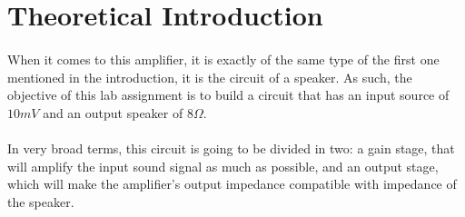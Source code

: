 \section{Theoretical Introduction}
\label{sec:theoretical}


\paragraph{}When it comes to this amplifier, it is exactly of the same type of the first one mentioned in the introduction, it is the circuit of a speaker. As such, the objective of this lab assignment is to build a circuit that has an input source of  $10mV$ and an output speaker of $8\Omega$.

\paragraph{}In very broad terms, this circuit is going to be divided in two: a gain stage, that will amplify the input sound signal as much as possible, and an output stage, which will make the amplifier's output impedance compatible with impedance of the speaker.  

\pagebreak
